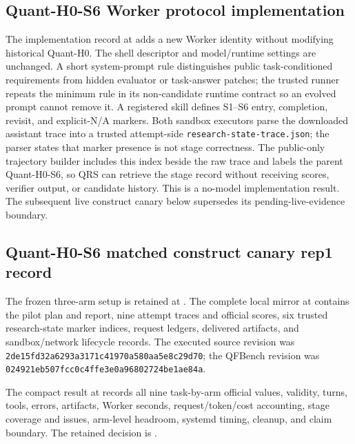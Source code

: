 \subsection{Quant-H0-S6 Worker protocol implementation}

The implementation record at
adds a new Worker identity without modifying historical Quant-H0. The shell
descriptor and model/runtime settings are unchanged. A short system-prompt rule
distinguishes public task-conditioned requirements from hidden evaluator or
task-answer patches; the trusted runner repeats the minimum rule in its
non-candidate runtime contract so an evolved prompt cannot remove it. A
registered skill defines S1--S6 entry, completion, revisit, and explicit-N/A
markers. Both sandbox executors parse the
downloaded assistant trace into a trusted attempt-side
\texttt{research-state-trace.json}; the parser states that marker presence is
not stage correctness. The public-only trajectory builder includes this index
beside the raw trace and labels the parent Quant-H0-S6, so QRS can retrieve the
stage record without receiving scores, verifier output, or candidate history.
This is a no-model implementation result. The subsequent live construct canary
below supersedes its pending-live-evidence boundary.

\subsection{Quant-H0-S6 matched construct canary rep1 record}

The frozen three-arm setup is retained at
. The complete local
mirror at
contains the pilot plan and report, nine attempt traces and official scores,
six trusted research-state marker indices, request ledgers, delivered
artifacts, and sandbox/network lifecycle records. The executed source revision
was \texttt{2de15fd32a6293a3171c41970a580aa5e8c29d70}; the QFBench revision was
\texttt{024921eb507fcc0c4ffe3e0a96802724be1ae84a}.

The compact result at
 records all
nine task-by-arm official values, validity, turns, tools, errors, artifacts,
Worker seconds, request/token/cost accounting, stage coverage and issues,
arm-level headroom, systemd timing, cleanup, and claim boundary. The retained
decision is
.

